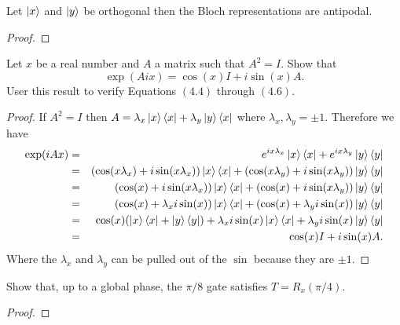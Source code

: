 \documentclass{article}
\begin{document}
\begin{lemma}
  Let $\ket{x}$ and $\ket{y}$ be orthogonal then the Bloch representations are antipodal. \label{lem:bloch}
  \begin{proof}

  \end{proof}
\end{lemma}

\begin{exercise}
  Let $x$ be a real number and $A$ a matrix such that $A^2=I$. Show that
  \[\exp(Aix)=\cos(x)I+i\sin(x)A.\]
  User this result to verify Equations $(4.4)$ through $(4.6)$.
  \begin{proof}
    If $A^2=I$ then $A=\lambda_x\ket{x}\bra{x}+\lambda_y\ket{y}\bra{x}$ where $\lambda_x,\lambda_y=\pm1$. Therefore we have
    \begin{eqnarray*}
      \exp(iAx)&=&e^{ix\lambda_x}\ket{x}\bra{x}+e^{ix\lambda_y}\ket{y}\bra{y} \\
      &=& \left(\cos(x\lambda_x)+i\sin(x\lambda_x)\right)\ket{x}\bra{x}+\left(\cos(x\lambda_y)+i\sin(x\lambda_y)\right)\ket{y}\bra{y} \\
      &=& \left(\cos(x)+i\sin(x\lambda_x)\right)\ket{x}\bra{x}+\left(\cos(x)+i\sin(x\lambda_y)\right)\ket{y}\bra{y} \\
      &=& \left(\cos(x)+\lambda_xi\sin(x)\right)\ket{x}\bra{x}+\left(\cos(x)+\lambda_yi\sin(x)\right)\ket{y}\bra{y} \\
      &=& \cos(x)(\ket{x}\bra{x}+\ket{y}\bra{y})+\lambda_xi\sin(x)\ket{x}\bra{x}+\lambda_yi\sin(x)\ket{y}\bra{y} \\
      &=&\cos(x)I+i\sin(x)A.
    \end{eqnarray*}
    Where the $\lambda_x$ and $\lambda_y$ can be pulled out of the $\sin$ because they are $\pm1$.
  \end{proof}
\end{exercise}

\begin{exercise}
  Show that, up to a global phase, the $\pi/8$ gate satisfies $T=R_x(\pi/4)$.
  \begin{proof}

  \end{proof}
\end{exercise}
\end{document}
